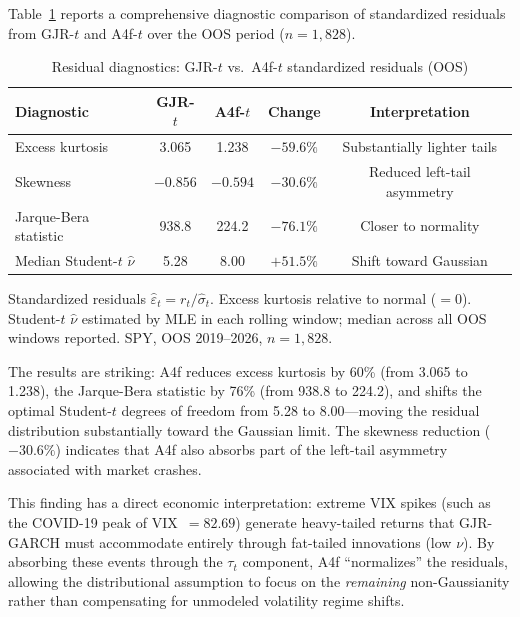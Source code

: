 \documentclass[12pt,a4paper]{article}
\begin{document}
Table~\ref{tab:residual_diagnostics} reports a comprehensive diagnostic comparison of standardized residuals from GJR-$t$ and A4f-$t$ over the OOS period ($n = 1{,}828$).

\begin{table}[H]
\centering
\caption{Residual diagnostics: GJR-$t$ vs.\ A4f-$t$ standardized residuals (OOS)}
\label{tab:residual_diagnostics}
\begin{threeparttable}
\small
\begin{tabular}{@{}lcccc@{}}
\toprule
Diagnostic & GJR-$t$ & A4f-$t$ & Change & Interpretation \\
\midrule
Excess kurtosis & 3.065 & 1.238 & $-59.6\%$ & Substantially lighter tails \\
Skewness & $-0.856$ & $-0.594$ & $-30.6\%$ & Reduced left-tail asymmetry \\
Jarque-Bera statistic & 938.8 & 224.2 & $-76.1\%$ & Closer to normality \\
Median Student-$t$ $\hat\nu$ & 5.28 & 8.00 & $+51.5\%$ & Shift toward Gaussian \\
\bottomrule
\end{tabular}
\begin{tablenotes}
\footnotesize
\item Standardized residuals $\hat\varepsilon_t = r_t / \hat\sigma_t$. Excess kurtosis relative to normal ($=0$). Student-$t$ $\hat\nu$ estimated by MLE in each rolling window; median across all OOS windows reported. SPY, OOS 2019--2026, $n = 1{,}828$.
\end{tablenotes}
\end{threeparttable}
\end{table}

The results are striking: A4f reduces excess kurtosis by 60\% (from 3.065 to 1.238), the Jarque-Bera statistic by 76\% (from 938.8 to 224.2), and shifts the optimal Student-$t$ degrees of freedom from 5.28 to 8.00---moving the residual distribution substantially toward the Gaussian limit. The skewness reduction ($-30.6\%$) indicates that A4f also absorbs part of the left-tail asymmetry associated with market crashes.

This finding has a direct economic interpretation: extreme VIX spikes (such as the COVID-19 peak of VIX~$= 82.69$) generate heavy-tailed returns that GJR-GARCH must accommodate entirely through fat-tailed innovations (low $\nu$). By absorbing these events through the $\tau_t$ component, A4f ``normalizes'' the residuals, allowing the distributional assumption to focus on the \emph{remaining} non-Gaussianity rather than compensating for unmodeled volatility regime shifts.
\end{document}
